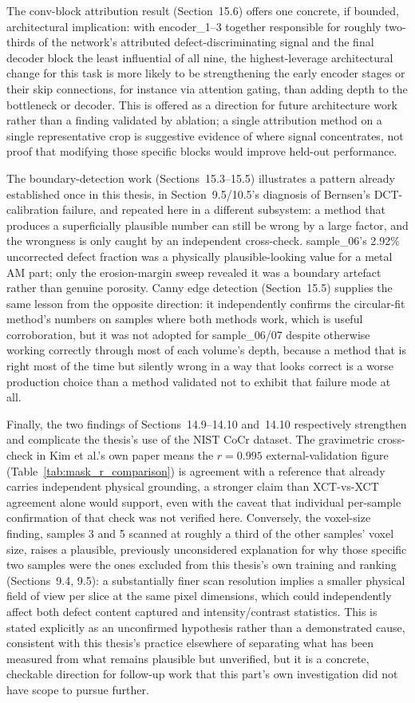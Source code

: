 The conv-block attribution result (Section~15.6) offers one concrete, if bounded, architectural
implication: with encoder\_1--3 together responsible for roughly two-thirds of the network's
attributed defect-discriminating signal and the final decoder block the least influential of all nine,
the highest-leverage architectural change for this task is more likely to be strengthening the early
encoder stages or their skip connections, for instance via attention gating, than adding depth to the
bottleneck or decoder. This is offered as a direction for future architecture work rather than a
finding validated by ablation; a single attribution method on a single representative crop is
suggestive evidence of where signal concentrates, not proof that modifying those specific blocks would
improve held-out performance.

The boundary-detection work (Sections~15.3--15.5) illustrates a pattern already established once in
this thesis, in Section~9.5/10.5's diagnosis of Bernsen's DCT-calibration failure, and repeated here in
a different subsystem: a method that produces a superficially plausible number can still be wrong by a
large factor, and the wrongness is only caught by an independent cross-check. sample\_06's 2.92\%
uncorrected defect fraction was a physically plausible-looking value for a metal AM part; only the
erosion-margin sweep revealed it was a boundary artefact rather than genuine porosity. Canny edge
detection (Section~15.5) supplies the same lesson from the opposite direction: it independently
confirms the circular-fit method's numbers on samples where both methods work, which is useful
corroboration, but it was not adopted for sample\_06/07 despite otherwise working correctly through
most of each volume's depth, because a method that is right most of the time but silently wrong in a
way that looks correct is a worse production choice than a method validated not to exhibit that
failure mode at all.

Finally, the two findings of Sections~14.9--14.10 and~14.10 respectively strengthen and complicate the
thesis's use of the NIST CoCr dataset. The gravimetric cross-check in Kim et al.'s own paper means the
$r = 0.995$ external-validation figure (Table~\ref{tab:mask_r_comparison}) is agreement with a
reference that already carries independent physical grounding, a stronger claim than XCT-vs-XCT
agreement alone would support, even with the caveat that individual per-sample confirmation of that
check was not verified here. Conversely, the voxel-size finding, samples 3 and 5 scanned at roughly a
third of the other samples' voxel size, raises a plausible, previously unconsidered explanation for why
those specific two samples were the ones excluded from this thesis's own training and ranking
(Sections~9.4, 9.5): a substantially finer scan resolution implies a smaller physical field of view per
slice at the same pixel dimensions, which could independently affect both defect content captured and
intensity/contrast statistics. This is stated explicitly as an unconfirmed hypothesis rather than a
demonstrated cause, consistent with this thesis's practice elsewhere of separating what has been
measured from what remains plausible but unverified, but it is a concrete, checkable direction for
follow-up work that this part's own investigation did not have scope to pursue further.
